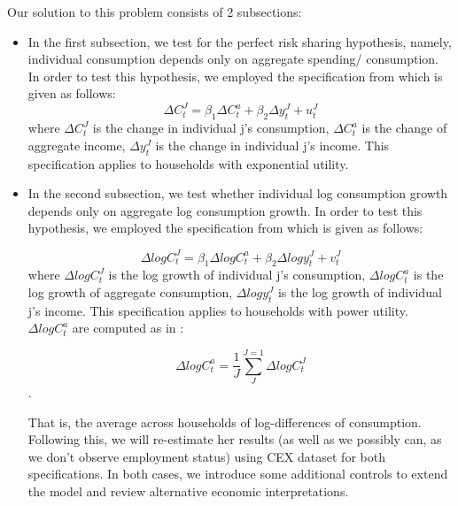 \documentclass[12pt,a4paper]{article}
\begin{document}
Our solution to this problem consists of 2 subsections:
\begin{itemize}
    \item In the first subsection, we test for the perfect risk sharing hypothesis, namely, individual consumption depends only on aggregate spending/ consumption. In order to test this hypothesis, we employed the specification from \citealp{mace1991} which is given as follows:
\begin{equation}\label{one}
      \Delta C_t^J =\beta_1 \Delta C_t^a + \beta_2 \Delta y_t^J + u_t^J
\end{equation}
where $\Delta C_t^J$ is the change in individual j's consumption, $\Delta C_t^a$ is the change of aggregate income, $\Delta y_t^J$ is the change in individual j's income. This specification applies to households with exponential utility.

\item In the second subsection, we test whether individual log consumption growth depends only on aggregate log consumption growth. In order to test this hypothesis, we employed the specification from \citealp{mace1991} which is given as follows:

\begin{equation}\label{two}
      \Delta log  C_t^J =\beta_1 \Delta log C_t^a + \beta_2 \Delta log y_t^J + v_t^J
\end{equation}
where   $\Delta log  C_t^J$ is the log growth of individual j's consumption,   $  \Delta log  C_t^a$ is the log growth of aggregate consumption,  $ \Delta log y_t^J$ is the log growth of  individual j's income. This specification applies to households with power utility. \\

$\Delta log  C_t^a$ are computed as in \citealp{mace1991}:

\begin{equation}\label{two}
      \Delta log  C_t^a = \frac{1}{J} \sum_{J}^{J=1} \Delta log  C_t^J
\end{equation}.

That is, the average across households of log-differences of consumption. \\

Following this, we will re-estimate her results (as well as we possibly can, as we don’t observe employment status) using CEX dataset for both specifications. In both cases, we introduce some additional controls to extend the model and review alternative economic interpretations.
\end{itemize}
\end{document}
